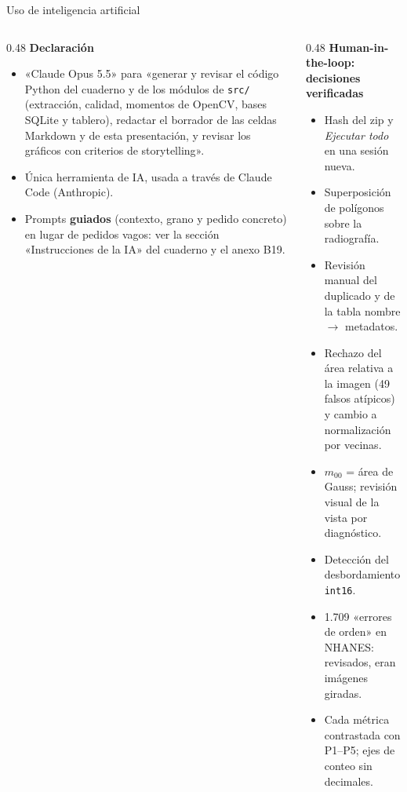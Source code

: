 \documentclass[aspectratio=169,10pt]{beamer}
\begin{document}
\begin{frame}{Uso de inteligencia artificial}
  \begin{columns}[T]
    \begin{column}{0.48\textwidth}
      \textbf{\color{itba}Declaración}\\[0.5ex]
      \scriptsize
      \begin{itemize}\setlength{\itemsep}{0.1ex}
        \item «Claude Opus 5.5» para «generar y revisar el código Python del cuaderno y de los módulos de \texttt{src/} (extracción, calidad, momentos de OpenCV, bases SQLite y tablero), redactar el borrador de las celdas Markdown y de esta presentación, y revisar los gráficos con criterios de storytelling».
        \item Única herramienta de IA, usada a través de Claude Code (Anthropic).
        \item Prompts \textbf{guiados} (contexto, grano y pedido concreto) en lugar de pedidos vagos: ver la sección «Instrucciones de la IA» del cuaderno y el anexo B19.
      \end{itemize}
    \end{column}
    \begin{column}{0.48\textwidth}
      \textbf{\color{itba}Human-in-the-loop: decisiones verificadas}\\[0.5ex]
      \scriptsize
      \begin{itemize}\setlength{\itemsep}{0.1ex}
        \item Hash del zip y \emph{Ejecutar todo} en una sesión nueva.
        \item Superposición de polígonos sobre la radiografía.
        \item Revisión manual del duplicado y de la tabla nombre $\rightarrow$ metadatos.
        \item Rechazo del área relativa a la imagen (49 falsos atípicos) y cambio a normalización por vecinas.
        \item $m_{00}$ = área de Gauss; revisión visual de la vista por diagnóstico.
        \item Detección del desbordamiento \texttt{int16}.
        \item 1.709 «errores de orden» en NHANES: revisados, eran imágenes giradas.
        \item Cada métrica contrastada con P1–P5; ejes de conteo sin decimales.
      \end{itemize}
    \end{column}
  \end{columns}
\end{frame}
\end{document}
